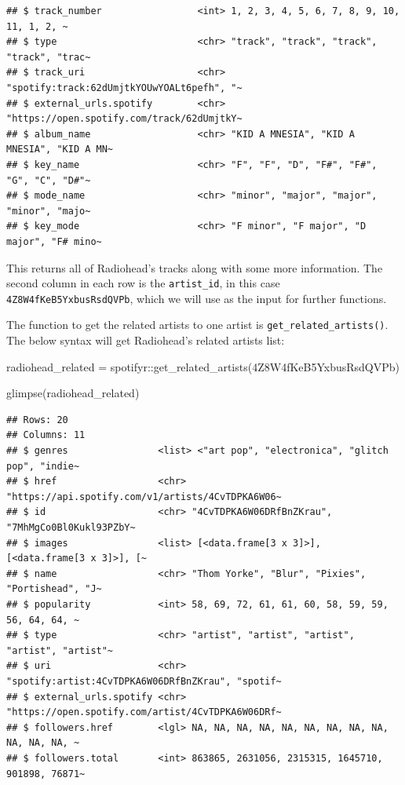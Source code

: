 \documentclass[
]{book}
\newenvironment{Shaded}{\begin{snugshade}}{\end{snugshade}}
\newcommand{\FunctionTok}[1]{\textcolor[rgb]{0.00,0.00,0.00}{#1}}
\newcommand{\NormalTok}[1]{#1}
\newcommand{\OtherTok}[1]{\textcolor[rgb]{0.56,0.35,0.01}{#1}}
\newcommand{\SpecialCharTok}[1]{\textcolor[rgb]{0.00,0.00,0.00}{#1}}
\newcommand{\StringTok}[1]{\textcolor[rgb]{0.31,0.60,0.02}{#1}}
\begin{document}
\begin{verbatim}
## $ track_number                 <int> 1, 2, 3, 4, 5, 6, 7, 8, 9, 10, 11, 1, 2, ~
## $ type                         <chr> "track", "track", "track", "track", "trac~
## $ track_uri                    <chr> "spotify:track:62dUmjtkYOUwYOALt6pefh", "~
## $ external_urls.spotify        <chr> "https://open.spotify.com/track/62dUmjtkY~
## $ album_name                   <chr> "KID A MNESIA", "KID A MNESIA", "KID A MN~
## $ key_name                     <chr> "F", "F", "D", "F#", "F#", "G", "C", "D#"~
## $ mode_name                    <chr> "minor", "major", "major", "minor", "majo~
## $ key_mode                     <chr> "F minor", "F major", "D major", "F# mino~
\end{verbatim}

This returns all of Radiohead's tracks along with some more information. The second column in each row is the \texttt{artist\_id}, in this case \texttt{4Z8W4fKeB5YxbusRsdQVPb}, which we will use as the input for further functions.

The function to get the related artists to one artist is \texttt{get\_related\_artists()}. The below syntax will get Radiohead's related artists list:

\begin{Shaded}
\begin{Highlighting}[]
\NormalTok{radiohead\_related }\OtherTok{=}\NormalTok{ spotifyr}\SpecialCharTok{::}\FunctionTok{get\_related\_artists}\NormalTok{(}\StringTok{\textquotesingle{}4Z8W4fKeB5YxbusRsdQVPb\textquotesingle{}}\NormalTok{)}

\FunctionTok{glimpse}\NormalTok{(radiohead\_related)}
\end{Highlighting}
\end{Shaded}

\begin{verbatim}
## Rows: 20
## Columns: 11
## $ genres                <list> <"art pop", "electronica", "glitch pop", "indie~
## $ href                  <chr> "https://api.spotify.com/v1/artists/4CvTDPKA6W06~
## $ id                    <chr> "4CvTDPKA6W06DRfBnZKrau", "7MhMgCo0Bl0Kukl93PZbY~
## $ images                <list> [<data.frame[3 x 3]>], [<data.frame[3 x 3]>], [~
## $ name                  <chr> "Thom Yorke", "Blur", "Pixies", "Portishead", "J~
## $ popularity            <int> 58, 69, 72, 61, 61, 60, 58, 59, 59, 56, 64, 64, ~
## $ type                  <chr> "artist", "artist", "artist", "artist", "artist"~
## $ uri                   <chr> "spotify:artist:4CvTDPKA6W06DRfBnZKrau", "spotif~
## $ external_urls.spotify <chr> "https://open.spotify.com/artist/4CvTDPKA6W06DRf~
## $ followers.href        <lgl> NA, NA, NA, NA, NA, NA, NA, NA, NA, NA, NA, NA, ~
## $ followers.total       <int> 863865, 2631056, 2315315, 1645710, 901898, 76871~
\end{verbatim}
\end{document}
